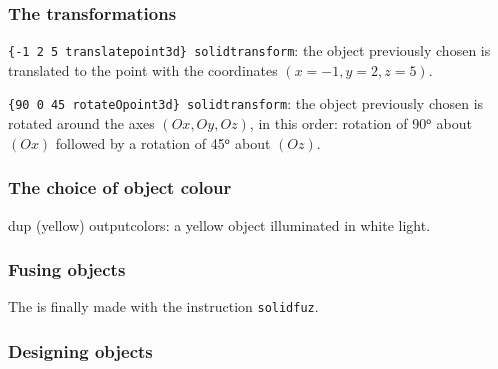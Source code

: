 \subsubsection{The transformations}

\begin{compactitem}
  \item \texttt{\{-1  2  5  translatepoint3d\} solidtransform}: the object
previously chosen is translated to the point with the
coordinates $(x=-1,y=2,z=5)$.
  \item \texttt{\{90  0  45  rotateOpoint3d\} solidtransform}: the object
previously chosen is rotated around the axes $(Ox,Oy,Oz)$, in
this order: rotation of 90$^\mathsf{o}$ about $(Ox)$ followed
by a rotation of 45$^\mathsf{o}$ about $(Oz)$.
\end{compactitem}

\subsubsection{The choice of object colour}

\begin{compactitem}
  \item dup (yellow) outputcolors: a yellow object illuminated in
  white light.
\end{compactitem}

\subsubsection{Fusing objects}

\begin{compactitem}
  \item The  is finally made with the instruction \texttt{solidfuz}.
\end{compactitem}

\subsubsection{Designing objects}

